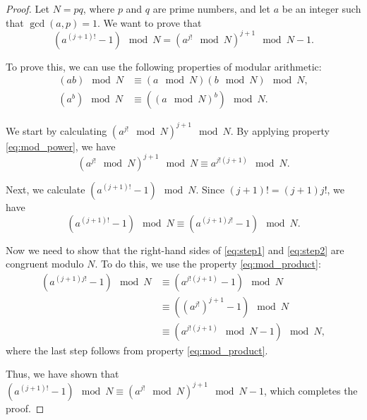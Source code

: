 \documentclass[12pt,openany]{book}
\begin{document}
	\begin{proof}
		Let $N = pq$, where $p$ and $q$ are prime numbers, and let $a$ be an integer such that $\gcd(a, p) = 1$. We want to prove that
		\begin{equation} \label{eq:congruence}
		(a^{(j+1)!} - 1) \mod N = (a^{j!} \mod N)^{j+1} \mod N - 1.
		\end{equation}
		
		To prove this, we can use the following properties of modular arithmetic:
		\begin{align}
		(ab) \mod N &\equiv (a \mod N)(b \mod N) \mod N, \label{eq:mod_product} \\
		(a^b) \mod N &\equiv ((a \mod N)^b) \mod N. \label{eq:mod_power}
		\end{align}
		
		We start by calculating $(a^{j!} \mod N)^{j+1} \mod N$. By applying property \eqref{eq:mod_power}, we have
		\begin{equation} \label{eq:step1}
		(a^{j!} \mod N)^{j+1} \mod N \equiv a^{j!(j+1)} \mod N.
		\end{equation}
		
		Next, we calculate $(a^{(j+1)!} - 1) \mod N$. Since $(j+1)! = (j+1)j!$, we have
		\begin{equation} \label{eq:step2}
		(a^{(j+1)!} - 1) \mod N \equiv (a^{(j+1)j!} - 1) \mod N.
		\end{equation}
		
		Now we need to show that the right-hand sides of \eqref{eq:step1} and \eqref{eq:step2} are congruent modulo $N$. To do this, we use the property \eqref{eq:mod_product}:
		\begin{align*}
		(a^{(j+1)j!} - 1) \mod N &\equiv (a^{j!(j+1)} - 1) \mod N \\
		&\equiv ((a^{j!})^{j+1} - 1) \mod N \\
		&\equiv (a^{j!(j+1)} \mod N - 1) \mod N,
		\end{align*}
		where the last step follows from property \eqref{eq:mod_product}.
		
		Thus, we have shown that $(a^{(j+1)!} - 1) \mod N \equiv (a^{j!} \mod N)^{j+1} \mod N - 1$, which completes the proof.
	\end{proof}
\end{document}
